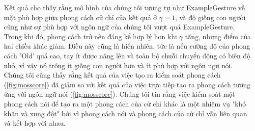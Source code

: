 Kết quả cho thấy rằng mô hình của chúng tôi tương tự như ExampleGesture về mặt phù hợp giữa phong cách cử chỉ của kết quả ở $\gamma=1$, và độ giống con người cũng như sự phù hợp với ngôn ngữ của chúng tôi vượt quá ExampleGesture. Trong khi đó, phong cách trở nên đáng kể hợp lý hơn khi $\gamma$ tăng, nhưng điểm của hai chiều khác giảm. Điều này cũng là hiển nhiên, tức là nếu cường độ của phong cách 'Old' quá cao, tay ít được nâng lên và toàn bộ chuỗi chuyển động có biên độ nhỏ, vì vậy nó trông ít giống con người hơn và ít phù hợp với ngôn ngữ nói. Chúng tôi cũng thấy rằng kết quả của việc tạo ra kiểm soát phong cách (\autoref{fig:mosscore}) đã giảm so với kết quả của việc trực tiếp tạo ra phong cách tương ứng với ngôn ngữ nói (\autoref{fig:mosscore}). Chúng tôi tin rằng việc kiểm soát một phong cách nói để tạo ra một phong cách của cử chỉ khác là một nhiệm vụ "khó khăn và xung đột" bởi vì phong cách nói và phong cách của cử chỉ vẫn liên quan và kết hợp với nhau.







